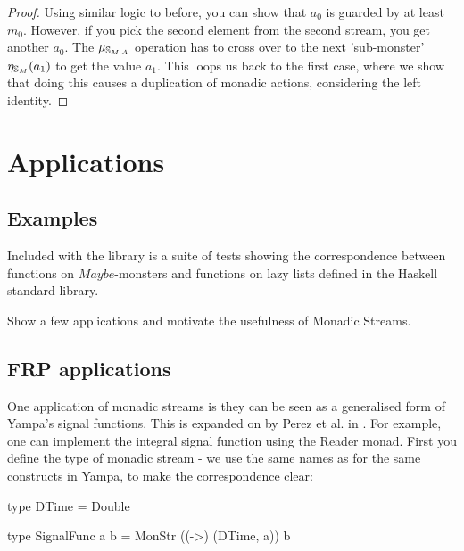 \documentclass{article}
\begin{document}
\begin{proof}
Using similar logic to before, you can show that $a_0$ is guarded by at least $m_0$. However, if you pick the second element from the second stream, you get another $a_0$. The $\mu_{\mathbb{S}_{M,A}}$ operation has to cross over to the next 'sub-monster' $\eta_{\mathbb{S}_{M}}(a_1)$ to get the value $a_1$. This loops us back to the first case, where we show that doing this causes a duplication of monadic actions, considering the left identity. 

\end{proof}

\section{Applications}

\subsection{Examples}

Included with the library is a suite of tests showing the correspondence between functions on $Maybe$-monsters and functions on lazy lists defined in the Haskell standard library.

\begin{ccomment}
	Show a few applications and motivate the usefulness of Monadic Streams.
\end{ccomment}

\subsection{FRP applications}

One application of monadic streams is they can be seen as a generalised form of Yampa's \cite{yampa_arcade} signal functions. This is expanded on by Perez et al. in \cite{frp_refactored}. For example, one can implement the integral signal function using the Reader monad. First you define the type of monadic stream - we use the same names as for the same constructs in Yampa, to make the correspondence clear:

\begin{haskell}
type DTime = Double

type SignalFunc a b = MonStr ((->) (DTime, a)) b
\end{haskell}

\end{document}
